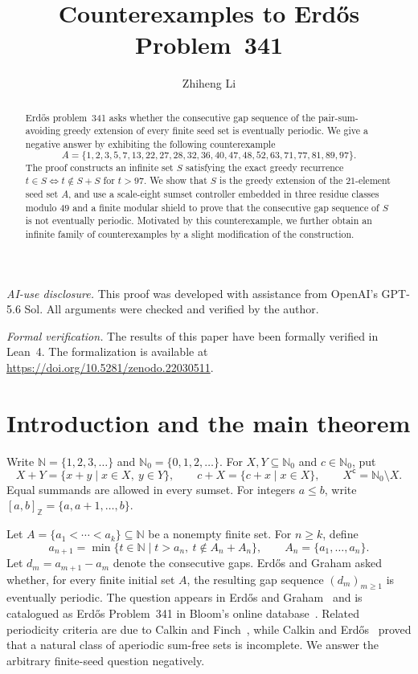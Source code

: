 \documentclass[11pt,letterpaper]{article}
\title{Counterexamples to Erd\H{o}s Problem~341}
\author{Zhiheng Li}
\date{}
\newcommand{\N}{\mathbb{N}}
\newcommand{\Nzero}{\mathbb{N}_0}
\newcommand{\cpl}[1]{#1^{\mathsf{c}}}
\newcommand{\ints}[2]{[#1,#2]_{\mathbb{Z}}}
\begin{document}
\maketitle

\begin{abstract}
Erd\H{o}s problem~341 asks whether the consecutive gap sequence of the pair-sum-avoiding greedy extension of every finite seed set is eventually periodic. We give a negative answer by exhibiting the following counterexample
\[
A=\{1,2,3,5,7,13,22,27,28,32,36,40,47,48,52,63,71,77,81,89,97\}.
\]
The proof constructs an infinite set \(S\) satisfying the exact greedy recurrence \(t\in S\Longleftrightarrow t\notin S+S\) for \(t>97\). We show that \(S\) is the greedy extension of the \(21\)-element seed set \(A\), and use a scale-eight sumset controller embedded in three residue classes modulo \(49\) and a finite modular shield to prove that the consecutive gap sequence of \(S\) is not eventually periodic. Motivated by this counterexample, we further obtain an infinite family of counterexamples by a slight modification of the construction.
\end{abstract}

\noindent\textit{AI-use disclosure.} This proof was developed with assistance from OpenAI's GPT-5.6 Sol. All arguments were checked and verified by the author.

\noindent\textit{Formal verification.} The results of this paper have been formally verified in Lean~4. The formalization is available at \href{https://doi.org/10.5281/zenodo.22030511}{https://doi.org/10.5281/zenodo.22030511}.

\section{Introduction and the main theorem}

Write \(\N=\{1,2,3,\ldots\}\) and \(\Nzero=\{0,1,2,\ldots\}\). For \(X,Y\subseteq\Nzero\) and \(c\in\Nzero\), put
\[
X+Y=\{x+y\mid x\in X,\ y\in Y\},
\qquad
c+X=\{c+x\mid x\in X\},
\qquad
\cpl{X}=\Nzero\setminus X.
\]
Equal summands are allowed in every sumset. For integers \(a\leq b\), write \(\ints{a}{b}=\{a,a+1,\ldots,b\}\). 

Let \(A=\{a_1<\cdots<a_k\}\subseteq\N\) be a nonempty finite set. For \(n\geq k\), define
\begin{equation}\label{eq:greedy-definition}
a_{n+1}
=\min\{t\in\N\mid t>a_n,\ t\notin A_n+A_n\},
\qquad
A_n=\{a_1,\ldots,a_n\}.
\end{equation}
Let \(d_m=a_{m+1}-a_m\) denote the consecutive gaps. Erd\H{o}s and Graham asked whether, for every finite initial set \(A\), the resulting gap sequence \((d_m)_{m\ge 1}\) is eventually periodic. The question appears in Erd\H{o}s and Graham~\cite[p.~53]{ErdosGraham1980} and is catalogued as Erd\H{o}s Problem~341 in Bloom's online database~\cite{Bloom341}. Related periodicity criteria are due to Calkin and Finch~\cite{CalkinFinch1996}, while Calkin and Erd\H{o}s~\cite{CalkinErdos1996} proved that a natural class of aperiodic sum-free sets is incomplete. We answer the arbitrary finite-seed question negatively.
\end{document}

